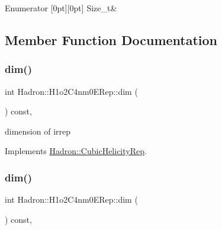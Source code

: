 \begin{DoxyEnumFields}{Enumerator}
[0pt][0pt]{}\mbox{\label{structHadron_1_1H1o2C4nm0ERep_aa1134f6e1b9b026c477f2ca1ca83a66aafd7257c8b0af5e1e23f94506086af1b1}} 
Size\+\_\+t&\\
\hline

\end{DoxyEnumFields}


\subsection{Member Function Documentation}
\mbox{\label{structHadron_1_1H1o2C4nm0ERep_a9c5abe37865ed4889e2411425733e664}} 
\subsubsection{\texorpdfstring{dim()}{dim()}\hspace{0.1cm}{\footnotesize\ttfamily [1/3]}}
{\footnotesize\ttfamily int Hadron\+::\+H1o2\+C4nm0\+E\+Rep\+::dim (\begin{DoxyParamCaption}{ }\end{DoxyParamCaption}) const\hspace{0.3cm}{\ttfamily [inline]}, {\ttfamily [virtual]}}

dimension of irrep 

Implements \mbox{\hyperlink{structHadron_1_1CubicHelicityRep_a95d229a05580e65f8bdde74a1e316855}{Hadron\+::\+Cubic\+Helicity\+Rep}}.

\mbox{\label{structHadron_1_1H1o2C4nm0ERep_a9c5abe37865ed4889e2411425733e664}} 
\subsubsection{\texorpdfstring{dim()}{dim()}\hspace{0.1cm}{\footnotesize\ttfamily [2/3]}}
{\footnotesize\ttfamily int Hadron\+::\+H1o2\+C4nm0\+E\+Rep\+::dim (\begin{DoxyParamCaption}{ }\end{DoxyParamCaption}) const\hspace{0.3cm}{\ttfamily [inline]}, {\ttfamily [virtual]}}

